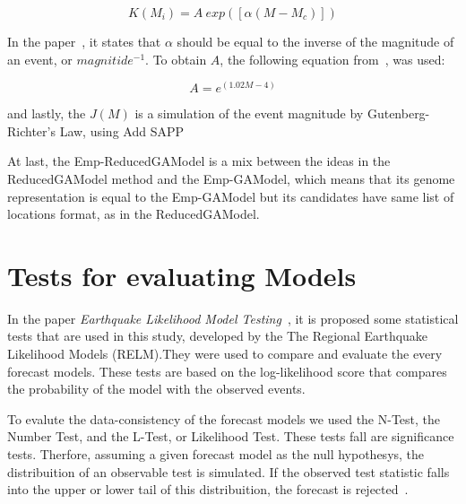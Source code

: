 \begin{equation}\label{triggered}
 K(M_i) = A\ exp([\alpha(M-M_c)])
\end{equation}

In the paper~\cite{ogata2006space}, it states that $\alpha$ should be
equal to the inverse of the magnitude of an event, or
$magnitide^{-1}$. To obtain $A$, the following equation
from~\cite{yamanaka1990scaling}, was used:

\begin{equation}
A = e^{(1.02M -4)}
\end{equation}



and lastly, the $J(M)$ is a simulation of the event magnitude by
Gutenberg-Richter's Law, using Add SAPP
%

At last, the Emp-ReducedGAModel is a mix between the ideas in the
ReducedGAModel method and the Emp-GAModel, which means that its genome
representation is equal to the Emp-GAModel but its candidates have
same list of locations format, as in the ReducedGAModel.

\section{Tests for evaluating Models}\label{Tests}

In the paper {\it Earthquake Likelihood Model
  Testing}~\cite{schorlemmer2007earthquake}, it is proposed some
statistical tests that are used in this study, developed by the The
Regional Earthquake Likelihood Models (RELM).They were used to compare
and evaluate the every forecast models. These tests are based on the
log-likelihood score that compares the probability of the model with
the observed events.

To evalute the data-consistency of the forecast models we used the
N-Test, the Number Test, and the L-Test, or Likelihood Test. These
tests fall are significance tests. Therfore, assuming a given forecast
model as the null hypothesys, the distribuition of an observable test
is simulated. If the observed test statistic falls into the upper or
lower tail of this distribuition, the forecast is
rejected~\cite{schorlemmer2010first}.

